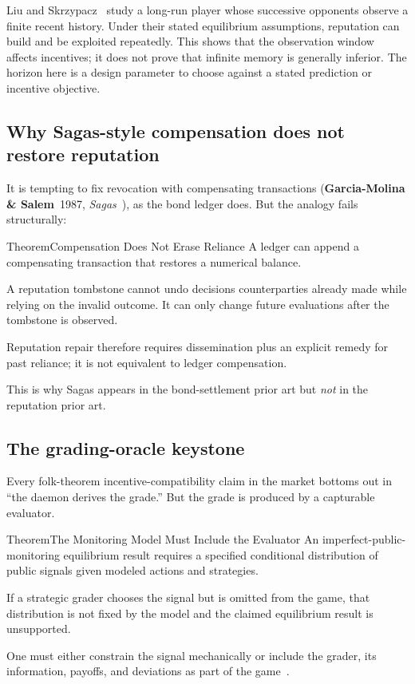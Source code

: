 \documentclass[11pt,a4paper]{article}
\theoremstyle{definition}
\theoremstyle{definition}
\theoremstyle{remark}
\begin{document}
Liu and Skrzypacz~ study a long-run player whose successive
opponents observe a finite recent history. Under their stated equilibrium
assumptions, reputation can build and be exploited repeatedly. This shows that
the observation window affects incentives; it does not prove that infinite
memory is generally inferior. The horizon here is a design parameter to choose
against a stated prediction or incentive objective.

\subsection{Why Sagas-style compensation does not restore reputation}

It is tempting to fix revocation with compensating transactions
(\textbf{Garcia-Molina \& Salem}~1987, \emph{Sagas}~), as the bond
ledger does. But the analogy fails structurally:

\begin{pdclaim}{Theorem}{Compensation Does Not Erase Reliance}
\setlength{\parskip}{4pt plus 1pt}
\label{prop:no-saga}
A ledger can append a compensating transaction that restores a numerical balance.


A reputation tombstone cannot undo decisions counterparties already made while
relying on the invalid outcome. It can only change future evaluations after the
tombstone is observed. 

Reputation repair therefore requires dissemination plus an
explicit remedy for past reliance; it is not equivalent to ledger compensation.
\end{pdclaim}

This is why Sagas appears in the bond-settlement prior art but \emph{not} in the
reputation prior art.

\subsection{The grading-oracle keystone}

Every folk-theorem incentive-compatibility claim in the market bottoms out in ``the
daemon derives the grade.'' But the grade is produced by a capturable evaluator.


\begin{pdclaim}{Theorem}{The Monitoring Model Must Include the Evaluator}
\setlength{\parskip}{4pt plus 1pt}
\label{thm:folk}
An imperfect-public-monitoring equilibrium result requires a specified conditional
distribution of public signals given modeled actions and strategies. 

If a strategic
grader chooses the signal but is omitted from the game, that distribution is not
fixed by the model and the claimed equilibrium result is unsupported. 

One must
either constrain the signal mechanically or include the grader, its information,
payoffs, and deviations as part of the game~.
\end{pdclaim}
\end{document}

